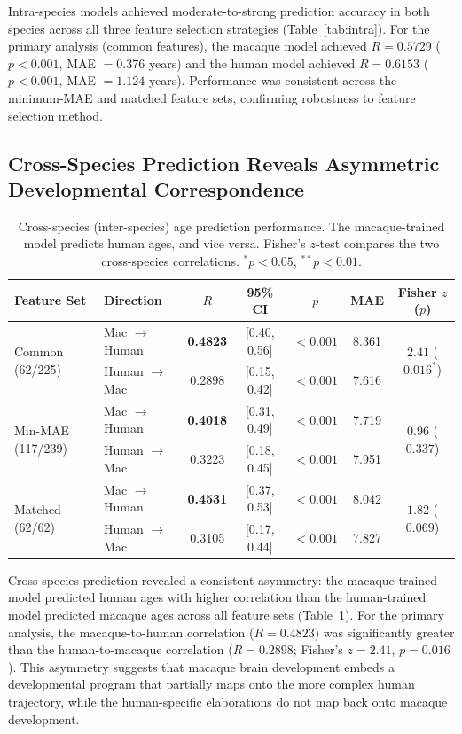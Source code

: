 \documentclass[11pt]{article}
\begin{document}
Intra-species models achieved moderate-to-strong prediction accuracy in both species across all three feature selection strategies (Table~\ref{tab:intra}). For the primary analysis (common features), the macaque model achieved $R = 0.5729$ ($p < 0.001$, MAE $= 0.376$ years) and the human model achieved $R = 0.6153$ ($p < 0.001$, MAE $= 1.124$ years). Performance was consistent across the minimum-MAE and matched feature sets, confirming robustness to feature selection method.

\subsection{Cross-Species Prediction Reveals Asymmetric Developmental Correspondence}

\begin{table}[H]
\centering
\caption{Cross-species (inter-species) age prediction performance. The macaque-trained model predicts human ages, and vice versa. Fisher's $z$-test compares the two cross-species correlations. $^{*}p < 0.05$, $^{**}p < 0.01$.}
\label{tab:cross}
\begin{tabular}{llccccc}
\toprule
Feature Set & Direction & $R$ & 95\% CI & $p$ & MAE & Fisher $z$ ($p$) \\
\midrule
\multirow{2}{*}{Common (62/225)} & Mac $\to$ Human & \textbf{0.4823} & [0.40, 0.56] & $< 0.001$ & 8.361 & \multirow{2}{*}{$2.41$ ($0.016^{*}$)} \\
 & Human $\to$ Mac & 0.2898 & [0.15, 0.42] & $< 0.001$ & 7.616 & \\
\midrule
\multirow{2}{*}{Min-MAE (117/239)} & Mac $\to$ Human & \textbf{0.4018} & [0.31, 0.49] & $< 0.001$ & 7.719 & \multirow{2}{*}{$0.96$ ($0.337$)} \\
 & Human $\to$ Mac & 0.3223 & [0.18, 0.45] & $< 0.001$ & 7.951 & \\
\midrule
\multirow{2}{*}{Matched (62/62)} & Mac $\to$ Human & \textbf{0.4531} & [0.37, 0.53] & $< 0.001$ & 8.042 & \multirow{2}{*}{$1.82$ ($0.069$)} \\
 & Human $\to$ Mac & 0.3105 & [0.17, 0.44] & $< 0.001$ & 7.827 & \\
\bottomrule
\end{tabular}
\end{table}

Cross-species prediction revealed a consistent asymmetry: the macaque-trained model predicted human ages with higher correlation than the human-trained model predicted macaque ages across all feature sets (Table~\ref{tab:cross}). For the primary analysis, the macaque-to-human correlation ($R = 0.4823$) was significantly greater than the human-to-macaque correlation ($R = 0.2898$; Fisher's $z = 2.41$, $p = 0.016$). This asymmetry suggests that macaque brain development embeds a developmental program that partially maps onto the more complex human trajectory, while the human-specific elaborations do not map back onto macaque development.
\end{document}
